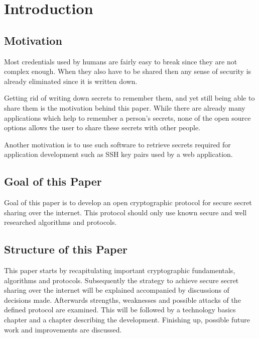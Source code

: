 \chapter{Introduction}
\label{cha:Introduction}

\section{Motivation}
\label{sec:Motivation}

Most credentials used by humans are fairly easy to break since they are not
complex enough. When they also have to be shared then any sense of security is
already eliminated since it is written down.

Getting rid of writing down secrets to remember them, and yet still being able
to share them is the motivation behind this paper. While there are already many
applications which help to remember a person's secrets, none of the open source
options allows the user to share these secrets with other people.

Another motivation is to use such software to retrieve secrets required for
application development such as SSH key pairs used by a web application.

\section{Goal of this Paper}
\label{sec:GoalOfThisPaper}

Goal of this paper is to develop an open cryptographic protocol for secure
secret sharing over the internet. This protocol should only use known secure
and well researched algorithms and protocols.

\section{Structure of this Paper}
\label{sec:StructureOfThisPaper}

This paper starts by recapitulating important cryptographic fundamentals,
algorithms and protocols. Subsequently the strategy to achieve secure secret
sharing over the internet will be explained accompanied by discussions of
decisions made. Afterwards strengths, weaknesses and possible attacks of the
defined protocol are examined. This will be followed by a technology basics chapter
and a chapter describing the development. Finishing up, possible future work and
improvements are discussed.
